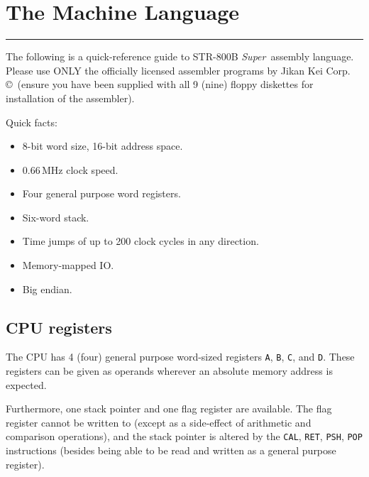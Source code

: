 \documentclass[a5paper,onecolumn,final,10pt]{memoir}
\newcommand\machinename%
	{\textsf{STR-800B \textit{Super}}}
\newcommand\companyname%
	{Jikan Kei Corp.\,\copyright}
\begin{document}
\noindent



\clearpage
\section{The Machine Language}
\vspace*{-20pt}\rule{\textwidth}{0.8pt}

\noindent
The following is a quick-reference guide to \machinename\ assembly language. Please use ONLY the officially licensed assembler programs by \companyname\ (ensure you have been supplied with all 9 (nine) floppy diskettes for installation of the assembler). 


Quick facts:
\begin{itemize}[nosep]
	\item 8-bit word size, 16-bit address space. 
	\item 0.66\,MHz clock speed. 
	\item Four general purpose word registers.
	\item Six-word stack. 
	\item Time jumps of up to 200 clock cycles in any direction.\footnotemark
	\item Memory-mapped IO. 
	\item Big endian. 
\end{itemize}

\subsection*{CPU registers}

The CPU has 4 (four) general purpose word-sized registers \texttt{A}, \texttt{B}, \texttt{C}, and \texttt{D}. 
These registers can be given as operands wherever an absolute memory address is expected. 

Furthermore, one stack pointer and one flag register are available. 
The flag register cannot be written to (except as a side-effect of arithmetic and comparison operations), 
and the stack pointer is altered by the \texttt{CAL}, \texttt{RET}, \texttt{PSH}, \texttt{POP} instructions 
(besides being able to be read and written as a general purpose register). 
\end{document}
